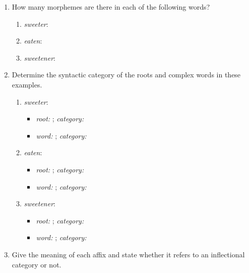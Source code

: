 \documentclass[11pt, oneside]{article}   	%
\begin{document}
\begin{enumerate}
\item How many morphemes are there in each of the following words?
	\begin{enumerate}
	\item {\it sweeter}: 
	\item {\it eaten}:
	\item {\it sweetener}:
	\end{enumerate}
\item Determine the syntactic category of the roots and complex words in these examples.
	\begin{enumerate}
	\item {\it sweeter}: 
		\begin{itemize}
		\item {\em root:} \underline{\hspace{1cm}}; {\em category:} \underline{\hspace{1cm}}
		\item {\em word:} \underline{\hspace{1cm}}; {\em category:} \underline{\hspace{1cm}}
		\end{itemize}
	\item {\it eaten}:
		\begin{itemize}
		\item {\em root:} \underline{\hspace{1cm}}; {\em category:} \underline{\hspace{1cm}}
		\item {\em word:} \underline{\hspace{1cm}}; {\em category:} \underline{\hspace{1cm}}
		\end{itemize}
	\item {\it sweetener}:
		\begin{itemize}
		\item {\em root:} \underline{\hspace{1cm}}; {\em category:} \underline{\hspace{1cm}}
		\item {\em word:} \underline{\hspace{1cm}}; {\em category:} \underline{\hspace{1cm}}
		\end{itemize}
	\end{enumerate}
\item Give the meaning of each affix and state whether it refers to an inflectional category or not.

\end{enumerate}
\end{document}
